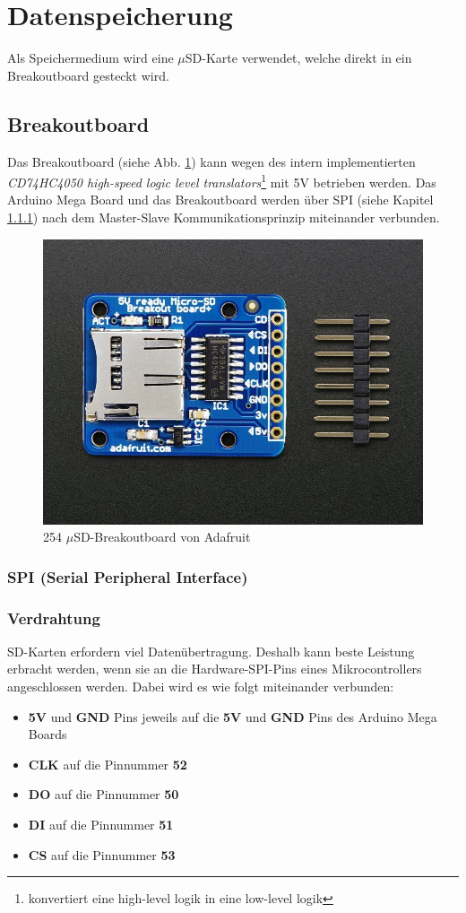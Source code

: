 \section{Datenspeicherung}
Als Speichermedium wird eine $\mu$SD-Karte verwendet, welche direkt in ein Breakoutboard gesteckt wird.\\
\subsection{Breakoutboard}
Das Breakoutboard (siehe Abb. \ref{fig:muSDBreakout}) kann wegen des intern implementierten \textit{CD74HC4050 high-speed logic level translators}\footnote{konvertiert eine high-level logik in eine low-level logik} mit 5V betrieben werden. Das Arduino Mega Board und das Breakoutboard werden über SPI (siehe Kapitel \ref{subsubsec:spi}) nach dem Master-Slave Kommunikationsprinzip miteinander verbunden. 
\begin{figure}[h]
\centering
\includegraphics[width=0.5\linewidth]{graphics/Datenspeicherung/micro_sd_card_breakout.png}
\caption{254 $\mu$SD-Breakoutboard von Adafruit \cite{ladyada2018}}
\label{fig:muSDBreakout}
\end{figure}

\subsubsection{SPI (Serial Peripheral Interface)}
\label{subsubsec:spi}
\subsubsection{Verdrahtung}
SD-Karten erfordern viel Datenübertragung. Deshalb kann beste Leistung erbracht werden, wenn sie an die Hardware-SPI-Pins eines Mikrocontrollers angeschlossen werden. Dabei wird es wie folgt miteinander verbunden: \cite{ladyada2018}
\begin{itemize}
\item \textbf{5V} und \textbf{GND} Pins jeweils auf die \textbf{5V} und \textbf{GND} Pins des Arduino Mega Boards
\item \textbf{CLK} auf die Pinnummer \textbf{52}
\item \textbf{DO} auf die Pinnummer \textbf{50}
\item \textbf{DI} auf die Pinnummer \textbf{51}
\item \textbf{CS} auf die Pinnummer \textbf{53}
\end{itemize}

